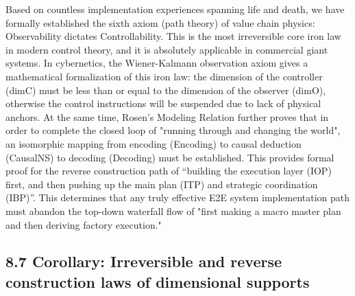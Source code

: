 \documentclass[11pt,a4paper]{article}
\begin{document}
Based on countless implementation experiences spanning life and death, we have formally established the sixth axiom (path theory) of value chain physics: Observability dictates Controllability. This is the most irreversible core iron law in modern control theory, and it is absolutely applicable in commercial giant systems. In cybernetics, the Wiener-Kalmann observation axiom gives a mathematical formalization of this iron law: the dimension of the controller (dimC) must be less than or equal to the dimension of the observer (dimO), otherwise the control instructions will be suspended due to lack of physical anchors. At the same time, Rosen's Modeling Relation further proves that in order to complete the closed loop of "running through and changing the world", an isomorphic mapping from encoding (Encoding) to causal deduction (CausalNS) to decoding (Decoding) must be established. This provides formal proof for the reverse construction path of “building the execution layer (IOP) first, and then pushing up the main plan (ITP) and strategic coordination (IBP)”. This determines that any truly effective E2E system implementation path must abandon the top-down waterfall flow of "first making a macro master plan and then deriving factory execution."


\subsection*{8.7 Corollary: Irreversible and reverse construction laws of dimensional supports}
\end{document}
